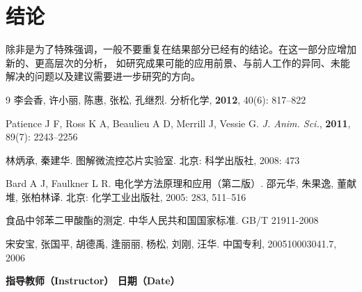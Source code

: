 \documentclass[a4paper]{article}
\newcommand{\zihaoWu}{\fontsize{10.5pt}{16pt}\selectfont}
\begin{document}
\section{结论}
\vspace{-0.5em}

除非是为了特殊强调，一般不要重复在结果部分已经有的结论。在这一部分应增加新的、更高层次的分析，
如研究成果可能的应用前景、与前人工作的异同、未能解决的问题以及建议需要进一步研究的方向。

\vspace{3em}
{\footnotesize
	\begin{thebibliography}{9}
		李会香, 许小丽, 陈惠, 张松, 孔继烈.
		{\kaishu 分析化学}, \textbf{2012}, 40(6): 817–822

		Patience J F, Ross K A, Beaulieu A D, Merrill J, Vessie G.
		\textit{J. Anim. Sci.}, \textbf{2011}, 89(7): 2243--2256

		林炳承, 秦建华.
		{\kaishu 图解微流控芯片实验室}.
		北京: 科学出版社, 2008: 473

		Bard A J, Faulkner L R.
			{\kaishu 电化学方法原理和应用（第二版）}.
		邵元华, 朱果逸, 董献堆, 张柏林译.
		北京: 化学工业出版社, 2005: 283, 511–516

		{\kaishu 食品中邻苯二甲酸酯的测定}.
		中华人民共和国国家标准. GB/T 21911-2008

		宋安宝, 张国平, 胡德禹, 逢丽丽, 杨松, 刘刚, 汪华.
		中国专利, 200510003041.7, 2006
	\end{thebibliography}
}


\vspace*{\fill}
\noindent{\zihaoWu 评语（Remarks）：}

\vspace{2em}

\begin{center}
	{\zihaoWu\bfseries 指导教师（Instructor）\hspace{8em} 日期（Date）}
\end{center}

\vspace{1.5cm}
\end{document}

